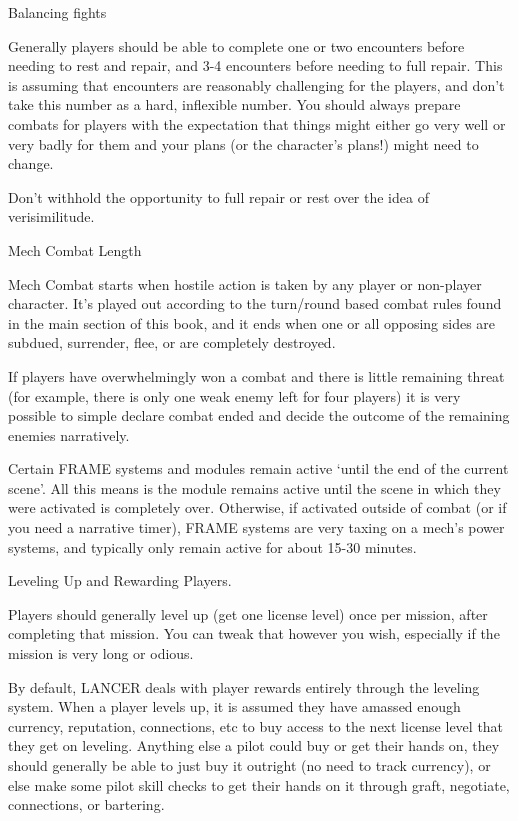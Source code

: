                                              Balancing fights  

                                                                                                          


Generally players should be able to complete one or two encounters before needing to rest and  
repair, and 3-4 encounters before needing to full repair. This is assuming that encounters are  
reasonably challenging for the players, and don’t take this number as a hard, inflexible number.  
You should always prepare combats for players with the expectation that things might either go  
very well or very badly for them and your plans (or the character’s plans!) might need to change.
 

Don’t withhold the opportunity to full repair or rest over the idea of verisimilitude.
 

                                          Mech Combat Length  

Mech Combat starts when hostile action is taken by any player or non-player character. It’s  
played out according to the turn/round based combat rules found in the main section of this  
book, and it ends when one or all opposing sides are subdued, surrender, flee, or are completely  
destroyed.
 

If players have overwhelmingly won a combat and there is little remaining threat (for example,  
there is only one weak enemy left for four players) it is very possible to simple declare combat  
ended and decide the outcome of the remaining enemies narratively.
 

Certain FRAME systems and modules remain active ‘until the end of the current scene’. All this  
means is the module remains active until the scene in which they were activated is completely  
over. Otherwise, if activated outside of combat (or if you need a narrative timer), FRAME systems  
are very taxing on a mech’s power systems, and typically only remain active for about 15-30  
minutes.
 

                                 Leveling Up and Rewarding Players.  

Players should generally level up (get one license level) once per mission, after completing that  
mission. You can tweak that however you wish, especially if the mission is very long or odious.
 

By default, LANCER deals with player rewards entirely through the leveling system. When a  
player levels up, it is assumed they have amassed enough currency, reputation, connections, etc  
to buy access to the next license level that they get on leveling. Anything else a pilot could buy  
or get their hands on, they should generally be able to just buy it outright (no need to track  
currency), or else make some pilot skill checks to get their hands on it through graft, negotiate,  
connections, or bartering.
 

